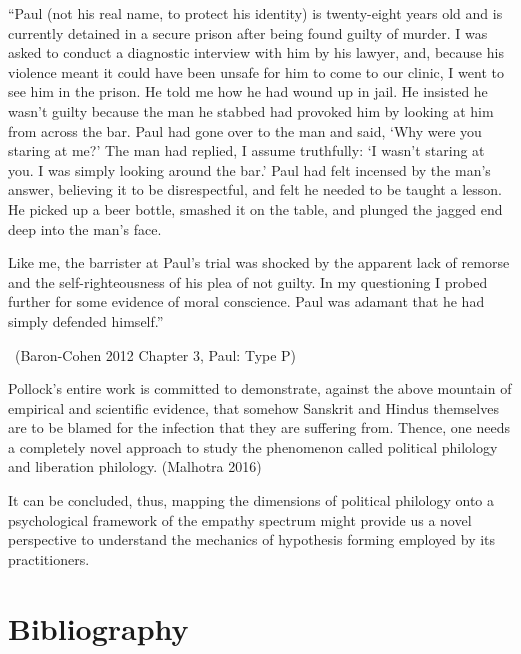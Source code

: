 \begin{myquote}
“Paul (not his real name, to protect his identity) is twenty-eight years old and is currently detained in a secure prison after being found guilty of murder. I was asked to conduct a diagnostic interview with him by his lawyer, and, because his violence meant it could have been unsafe for him to come to our clinic, I went to see him in the prison. He told me how he had wound up in jail. He insisted he wasn’t guilty because the man he stabbed had provoked him by looking at him from across the bar. Paul had gone over to the man and said, ‘Why were you staring at me?’ The man had replied, I assume truthfully: ‘I wasn’t staring at you. I was simply looking around the bar.’ Paul had felt incensed by the man’s answer, believing it to be disrespectful, and felt he needed to be taught a lesson. He picked up a beer bottle, smashed it on the table, and plunged the jagged end deep into the man’s face.
\end{myquote}

\begin{myquote}
Like me, the barrister at Paul’s trial was shocked by the apparent lack of remorse and the self-righteousness of his plea of not guilty. In my questioning I probed further for some evidence of moral conscience. Paul was adamant that he had simply defended himself.” 

~\hfill (Baron-Cohen 2012 Chapter 3, Paul: Type P)
\end{myquote}

Pollock's entire work is committed to demonstrate, against the above mountain of empirical and scientific evidence, that somehow Sanskrit and Hindus themselves are to be blamed for the infection that they are suffering from. Thence, one needs a completely novel approach to study the phenomenon called political philology and liberation philology. (Malhotra 2016)

\newpage

It can be concluded, thus, mapping the dimensions of political philology onto a psychological framework of the empathy spectrum might provide us a novel perspective to understand the mechanics of hypothesis forming employed by its practitioners.


\section*{Bibliography}

